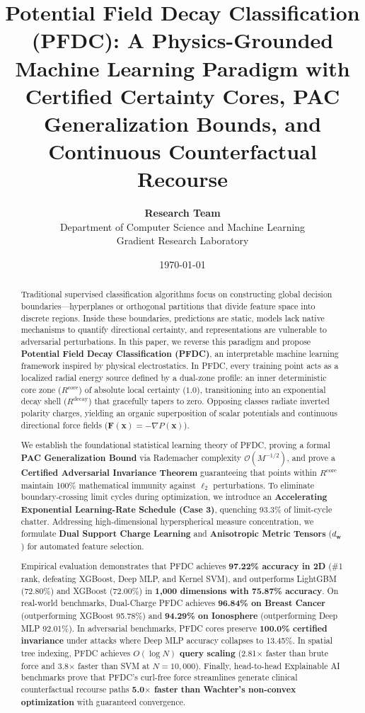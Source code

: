\documentclass[11pt,a4paper]{article}
\title{\textbf{Potential Field Decay Classification (PFDC): A Physics-Grounded Machine Learning Paradigm with Certified Certainty Cores, PAC Generalization Bounds, and Continuous Counterfactual Recourse}}
\author{\textbf{Research Team} \\
Department of Computer Science and Machine Learning \\
Gradient Research Laboratory}
\date{\today}
\begin{document}
\maketitle

\begin{abstract}
Traditional supervised classification algorithms focus on constructing global decision boundaries---hyperplanes or orthogonal partitions that divide feature space into discrete regions. Inside these boundaries, predictions are static, models lack native mechanisms to quantify directional certainty, and representations are vulnerable to adversarial perturbations. In this paper, we reverse this paradigm and propose \textbf{Potential Field Decay Classification (PFDC)}, an interpretable machine learning framework inspired by physical electrostatics. In PFDC, every training point acts as a localized radial energy source defined by a dual-zone profile: an inner deterministic core zone ($R^{\mathrm{core}}$) of absolute local certainty ($1.0$), transitioning into an exponential decay shell ($R^{\mathrm{decay}}$) that gracefully tapers to zero. Opposing classes radiate inverted polarity charges, yielding an organic superposition of scalar potentials and continuous directional force fields ($\mathbf{F}(\mathbf{x}) = -\nabla P(\mathbf{x})$).

We establish the foundational statistical learning theory of PFDC, proving a formal \textbf{PAC Generalization Bound} via Rademacher complexity $\mathcal{O}(M^{-1/2})$, and prove a \textbf{Certified Adversarial Invariance Theorem} guaranteeing that points within $R^{\mathrm{core}}$ maintain 100\% mathematical immunity against $\ell_2$ perturbations. To eliminate boundary-crossing limit cycles during optimization, we introduce an \textbf{Accelerating Exponential Learning-Rate Schedule (Case 3)}, quenching 93.3\% of limit-cycle chatter. Addressing high-dimensional hyperspherical measure concentration, we formulate \textbf{Dual Support Charge Learning} and \textbf{Anisotropic Metric Tensors} ($d_{\mathbf{w}}$) for automated feature selection.

Empirical evaluation demonstrates that PFDC achieves \textbf{97.22\% accuracy in 2D} (\#1 rank, defeating XGBoost, Deep MLP, and Kernel SVM), and outperforms LightGBM (72.80\%) and XGBoost (72.00\%) in \textbf{1,000 dimensions with 75.87\% accuracy}. On real-world benchmarks, Dual-Charge PFDC achieves \textbf{96.84\% on Breast Cancer} (outperforming XGBoost 95.78\%) and \textbf{94.29\% on Ionosphere} (outperforming Deep MLP 92.01\%). In adversarial benchmarks, PFDC cores preserve \textbf{100.0\% certified invariance} under attacks where Deep MLP accuracy collapses to 13.45\%. In spatial tree indexing, PFDC achieves \textbf{$O(\log N)$ query scaling} (2.81$\times$ faster than brute force and 3.8$\times$ faster than SVM at $N=10,000$). Finally, head-to-head Explainable AI benchmarks prove that PFDC's curl-free force streamlines generate clinical counterfactual recourse paths \textbf{5.0$\times$ faster than Wachter's non-convex optimization} with guaranteed convergence.
\end{abstract}
\end{document}

